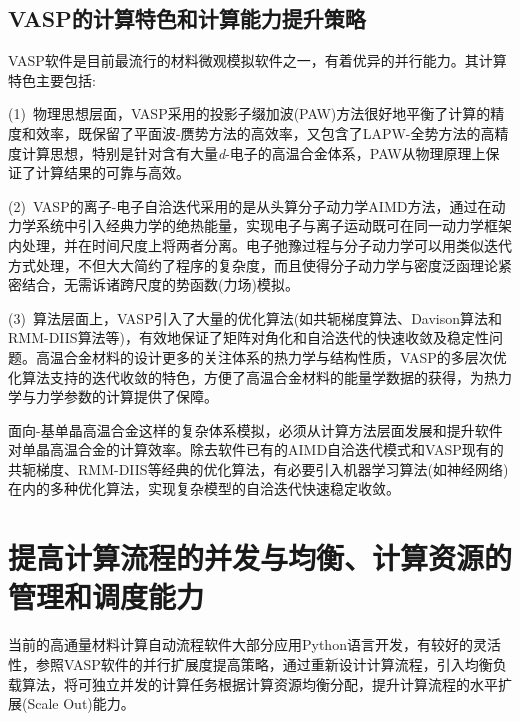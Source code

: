 \subsection{\rm{VASP}的计算特色和计算能力提升策略}
\textrm{VASP}软件是目前最流行的材料微观模拟软件之一，有着优异的并行能力。其计算特色主要包括:

(1)~物理思想层面，\textrm{VASP}采用的投影子缀加波\textrm{(PAW)}方法很好地平衡了计算的精度和效率，既保留了平面波-赝势方法的高效率，又包含了\textrm{LAPW}-全势方法的高精度计算思想，特别是针对含有大量\textit{d}-电子的高温合金体系，\textrm{PAW}从物理原理上保证了计算结果的可靠与高效。

(2)~\textrm{VASP}的离子-电子自洽迭代采用的是从头算分子动力学\textrm{AIMD}方法，通过在动力学系统中引入经典力学的绝热能量，实现电子与离子运动既可在同一动力学框架内处理，并在时间尺度上将两者分离。电子弛豫过程与分子动力学可以用类似迭代方式处理，不但大大简约了程序的复杂度，而且使得分子动力学与密度泛函理论紧密结合，无需诉诸跨尺度的势函数(力场)模拟。

(3)~算法层面上，\textrm{VASP}引入了大量的优化算法(如共轭梯度算法、\textrm{Davison}算法和\textrm{RMM-DIIS}算法等)，有效地保证了矩阵对角化和自洽迭代的快速收敛及稳定性问题。高温合金材料的设计更多的关注体系的热力学与结构性质，\textrm{VASP}的多层次优化算法支持的迭代收敛的特色，方便了高温合金材料的能量学数据的获得，为热力学与力学参数的计算提供了保障。

面向-基单晶高温合金这样的复杂体系模拟，必须从计算方法层面发展和提升软件对单晶高温合金的计算效率。除去软件已有的\textrm{AIMD}自洽迭代模式和\textrm{VASP}现有的共轭梯度、\textrm{RMM-DIIS}等经典的优化算法，有必要引入机器学习算法(如神经网络)在内的多种优化算法，实现复杂模型的自洽迭代快速稳定收敛。

\section{提高计算流程的并发与均衡、计算资源的管理和调度能力}
当前的高通量材料计算自动流程软件大部分应用\textrm{Python}语言开发，有较好的灵活性，参照\textrm{VASP}软件的并行扩展度提高策略，通过重新设计计算流程，引入均衡负载算法，将可独立并发的计算任务根据计算资源均衡分配，提升计算流程的水平扩展\textrm{(Scale Out)}能力。

